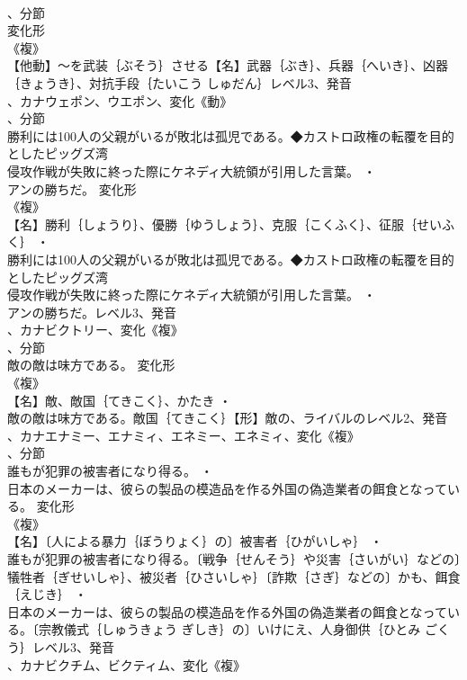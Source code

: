 \documentclass[8pt]{extreport}
\begin{document}
\begin{CJK}{UTF8}{min}
\\	、分節
\\	変化形 
\\	《複》
\\	【他動】～を武装｛ぶそう｝させる【名】武器｛ぶき｝、兵器｛へいき｝、凶器｛きょうき｝、対抗手段｛たいこう しゅだん｝レベル3、発音
\\	、カナウェポン、ウエポン、変化《動》
\\	、分節
\\	勝利には100人の父親がいるが敗北は孤児である。◆カストロ政権の転覆を目的としたピッグズ湾
\\	侵攻作戦が失敗に終った際にケネディ大統領が引用した言葉。 ・
\\	アンの勝ちだ。	変化形 
\\	《複》
\\	【名】勝利｛しょうり｝、優勝｛ゆうしょう｝、克服｛こくふく｝、征服｛せいふく｝ ・
\\	勝利には100人の父親がいるが敗北は孤児である。◆カストロ政権の転覆を目的としたピッグズ湾
\\	侵攻作戦が失敗に終った際にケネディ大統領が引用した言葉。 ・
\\	アンの勝ちだ。レベル3、発音
\\	、カナビクトリー、変化《複》
\\	、分節
\\	敵の敵は味方である。	変化形 
\\	《複》
\\	【名】敵、敵国｛てきこく｝、かたき ・
\\	敵の敵は味方である。敵国｛てきこく｝【形】敵の、ライバルのレベル2、発音
\\	、カナエナミー、エナミィ、エネミー、エネミィ、変化《複》
\\	、分節
\\	誰もが犯罪の被害者になり得る。 ・
\\	日本のメーカーは、彼らの製品の模造品を作る外国の偽造業者の餌食となっている。	変化形 
\\	《複》
\\	【名】〔人による暴力｛ぼうりょく｝の〕被害者｛ひがいしゃ｝ ・
\\	誰もが犯罪の被害者になり得る。〔戦争｛せんそう｝や災害｛さいがい｝などの〕犠牲者｛ぎせいしゃ｝、被災者｛ひさいしゃ｝〔詐欺｛さぎ｝などの〕かも、餌食｛えじき｝ ・
\\	日本のメーカーは、彼らの製品の模造品を作る外国の偽造業者の餌食となっている。〔宗教儀式｛しゅうきょう ぎしき｝の〕いけにえ、人身御供｛ひとみ ごくう｝レベル3、発音
\\	、カナビクチム、ビクティム、変化《複》

\end{CJK}
\end{document}
